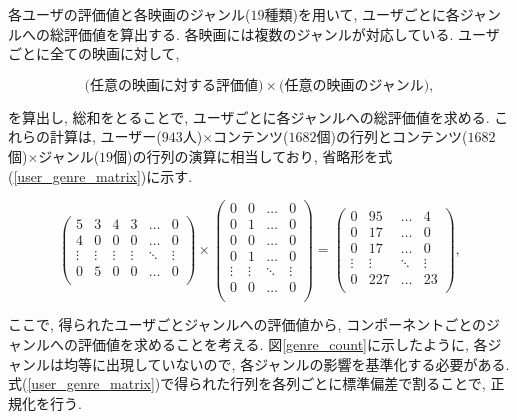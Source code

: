 \documentclass[a4j,12pt]{jarticle}
\begin{document}
\newpage
各ユーザの評価値と各映画のジャンル($19$種類)を用いて, ユーザごとに各ジャンルへの総評価値を算出する. 各映画には複数のジャンルが対応している. ユーザごとに全ての映画に対して, 

\begin{equation*}
\mbox{(任意の映画に対する評価値)} \times \mbox{(任意の映画のジャンル)},
\end{equation*}

\noindent
を算出し, 総和をとることで, ユーザごとに各ジャンルへの総評価値を求める. これらの計算は, ユーザー($943$人)$\times$コンテンツ($1682$個)の行列とコンテンツ($1682$個)$\times$ジャンル($19$個)の行列の演算に相当しており, 省略形を式(\ref{user_genre_matrix})に示す. 

\begin{equation}
\label{user_genre_matrix}
\begin{pmatrix} 
5 & 3 & 4 & 3 & \ldots & 0 \\
4 & 0 & 0 & 0 & \ldots & 0 \\
\vdots & \vdots & \vdots & \vdots & \ddots & \vdots \\
0 & 5 & 0 & 0 & \ldots & 0 \\
\end{pmatrix} 
\times
\begin{pmatrix} 
0 & 0 & \ldots & 0 \\
0 & 1 & \ldots & 0 \\
0 & 0 & \ldots & 0 \\
0 & 1 & \ldots & 0 \\
\vdots & \vdots & \ddots & \vdots \\
0 & 0 & \ldots & 0 \\
\end{pmatrix}
=
\begin{pmatrix} 
0 & 95 & \ldots & 4 \\
0 & 17 & \ldots & 0 \\
0 & 17 & \ldots & 0 \\
\vdots & \vdots & \ddots & \vdots \\
0 & 227 & \ldots & 23 \\
\end{pmatrix},
\end{equation}

\noindent
ここで, 得られたユーザごとジャンルへの評価値から, コンポーネントごとのジャンルへの評価値を求めることを考える. 図\ref{genre_count}に示したように, 各ジャンルは均等に出現していないので, 各ジャンルの影響を基準化する必要がある. 式(\ref{user_genre_matrix})で得られた行列を各列ごとに標準偏差で割ることで, 正規化を行う. 
\end{document}
